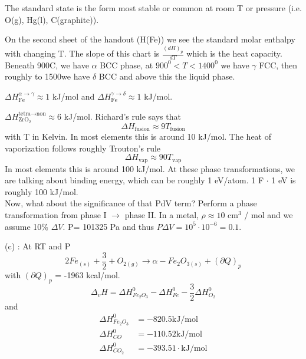 \documentclass[12pt]{article}
\begin{document}
The standard state is the form most stable or common at room T or pressure (i.e. O\2(g), Hg(l), C(graphite)).

On the second sheet of the handout (H\degree(Fe)) we see the standard molar enthalpy with changing T.  The slope of this chart is $\frac{(dH)_p}{dT}$ which is the heat capacity.  Beneath 900\degree C, we have $\alpha$ BCC phase, at $900^0 < T < 1400^0$ we have $\gamma$ FCC, then roughly to 1500\degree we have $\delta$ BCC and above this the liquid phase.

$\Delta H_\text{Fe}^{\alpha \rightarrow \gamma} \approx 1$ kJ/mol and $\Delta H_\text{Fe}^{\gamma \rightarrow \delta} \approx 1$ kJ/mol.

$\Delta H_{\text{ZrO}_2}^{\text{tetra}\rightarrow \text{non}} \approx 6$ kJ/mol.  Richard's rule says that
\begin{equation}
\Delta H_\text{fusion} \approx 9 T_\text{fusion}
\end{equation}
with T in Kelvin.  In most elements this is around 10 kJ/mol.  The heat of vaporization follows roughly Trouton's rule
\begin{equation}
\Delta H_\text{vap} \approx 90 T_\text{vap}
\end{equation}
In most elements this is around 100 kJ/mol.  At these phase transformations, we are talking about binding energy, which can be roughly 1 eV/atom.  1 F $\cdot$ 1 eV is roughly 100 kJ/mol.\\

Now, what about the significance of that PdV term?  Perform a phase transformation from phase I $\rightarrow$ phase II.  In a metal, $\rho \approx 10$ cm$^3$ / mol and we assume 10\% $\Delta V$.  P\degree = 101325 Pa and thus $P \Delta V = 10^5 \cdot 10^{-6} = 0.1$.

(c) : At RT and P\degree
\begin{equation}
2 Fe_{(s)} + \frac{3}{2} + O_{2 (g)} \rightarrow \alpha-Fe_2O_{3 (s)} + (\partial Q)_p
\end{equation}
with $(\partial Q)_p$ = -1963 kcal/mol.
\begin{equation}
\Delta_v H = \Delta H^0_{Fe_2O_3} - \Delta H^0_{Fe} - \frac{3}{2} \Delta H^0_{O_2}
\end{equation}
and
\begin{align*}
\Delta H^0_{Fe_2O_3} &= -820.5 \text{kJ}/\text{mol}\\
\Delta H^0_{CO} &= -110.52 \text{kJ}/\text{mol}\\
\Delta H^0_{CO_2} &= -393.51 \cdot \text{kJ}/\text{mol}
\end{align*}
\end{document}

